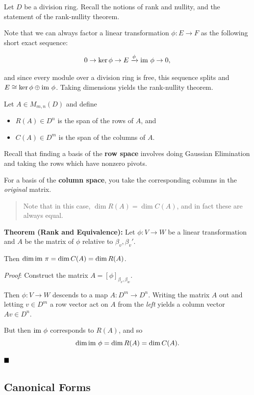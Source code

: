 Let \(D\) be a division ring. Recall the notions of rank and nullity,
and the statement of the rank-nullity theorem.

Note that we can always factor a linear transformation \(\phi: E\to F\)
as the following short exact sequence:

\[
0 \to \ker \phi \to E \xrightarrow{\phi} {\text{im}~} \phi \to 0,
\]

and since every module over a division ring is free, this sequence
splits and \(E \cong \ker\phi \oplus {\text{im}~} \phi\). Taking dimensions
yields the rank-nullity theorem.

Let \(A\in M_{m, n}(D)\) and define

\begin{itemize}
\item
  \(R(A) \in D^n\) is the span of the rows of \(A\), and
\item
  \(C(A) \in D^m\) is the span of the columns of \(A\).
\end{itemize}

Recall that finding a basis of the \textbf{row space} involves doing
Gaussian Elimination and taking the rows which have nonzero pivots.

For a basis of the \textbf{column space}, you take the corresponding
columns in the \emph{original} matrix.

\begin{quote}
Note that in this case, \(\dim R(A) = \dim C(A)\), and in fact these are
always equal.
\end{quote}

\textbf{Theorem (Rank and Equivalence):} Let \(\phi: V\to W\) be a
linear transformation and \(A\) be the matrix of \(\phi\) relative to
\(\beta_v, \beta_v'\).

Then \(\dim {\text{im}~} \pi = \dim C(A) = \dim R(A)\).

\emph{Proof}: Construct the matrix \(A = [\phi]_{\beta_v, \beta_w}\).

Then \(\phi: V \to W\) descends to a map \(A: D^m \to D^n\). Writing the
matrix \(A\) out and letting \(v\in D^m\) a row vector act on \(A\) from
the \emph{left} yields a column vector \(Av \in D^n\).

But then \({\text{im}~} \phi\) corresponds to \(R(A)\), and so \[
\dim {\text{im}~} \phi = \dim R(A) = \dim C(A)
.\]

\(\qed\)

\hypertarget{canonical-forms}{%
\subsection{Canonical Forms}\label{canonical-forms}}

